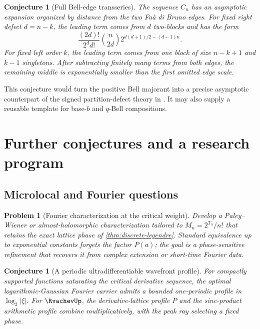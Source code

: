\documentclass[11pt,a4paper]{article}
\newtheorem{conjecture}[theorem]{Conjecture}
\newtheorem{problem}[theorem]{Problem}
\theoremstyle{definition}
\theoremstyle{remark}
\begin{document}
\begin{conjecture}[Full Bell-edge transseries]
\label{conj:bell-transseries}
The sequence $C_n$ has an asymptotic expansion organized by distance from the two
Fa\`a di Bruno edges.  For fixed right defect $d=n-k$, the leading term comes from
$d$ two-blocks and has the form
\begin{equation}
  \frac{(2d)!}{2^d d!}\binom n{2d}
  2^{d(d+1)/2-(d-1)n}.
  \label{eq:right-edge-general}
\end{equation}
For fixed left order $k$, the leading term comes from one block of size $n-k+1$ and
$k-1$ singletons.  After subtracting finitely many terms from both edges, the
remaining middle is exponentially smaller than the first omitted edge scale.
\end{conjecture}

This conjecture would turn the positive Bell majorant into a precise asymptotic
counterpart of the signed partition-defect theory in \cite{ProveItIterates}.  It may
also supply a reusable template for base-$b$ and $q$-Bell compositions.

\section{Further conjectures and a research program}
\label{sec:future}

\subsection{Microlocal and Fourier questions}

\begin{problem}[Fourier characterization at the critical weight]
Develop a Paley--Wiener or almost-holomorphic characterization tailored to
$M_n=2^{T_n}/n!$ that retains the exact lattice phase of
\cref{thm:discrete-legendre}.  Standard equivalence up to exponential constants
forgets the factor $P(a)$; the goal is a phase-sensitive refinement that recovers it
from complex extension or short-time Fourier data.
\end{problem}

\begin{conjecture}[A periodic ultradifferentiable wavefront profile]
For compactly supported functions saturating the critical derivative sequence, the
optimal logarithmic-Gaussian Fourier carrier admits a bounded one-periodic profile
in $\log_2|\xi|$.  For $\RvachevUp$, the derivative-lattice profile $P$ and the sinc-product
arithmetic profile combine multiplicatively, with the peak ray selecting a fixed
phase.
\end{conjecture}
\end{document}
